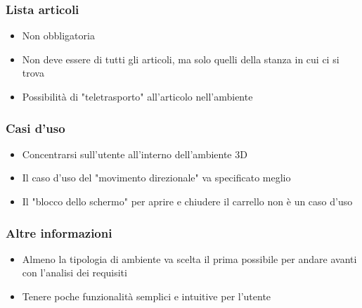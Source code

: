 \subsubsection{Lista articoli}
\begin{itemize}
    \item Non obbligatoria
    \item Non deve essere di tutti gli articoli, ma solo quelli della stanza in cui ci si trova
    \item Possibilità di "teletrasporto" all'articolo nell'ambiente
\end{itemize}
\subsubsection{Casi d'uso}
\begin{itemize}
    \item Concentrarsi sull'utente all'interno dell'ambiente 3D 
    \item Il caso d'uso del "movimento direzionale" va specificato meglio 
    \item Il "blocco dello schermo" per aprire e chiudere il carrello non 
            è un caso d'uso
\end{itemize}
\subsubsection{Altre informazioni}
\begin{itemize}
    \item Almeno la tipologia di ambiente va scelta il prima possibile per andare avanti con 
            l'analisi dei requisiti
    \item Tenere poche funzionalità semplici e intuitive per l'utente
\end{itemize}